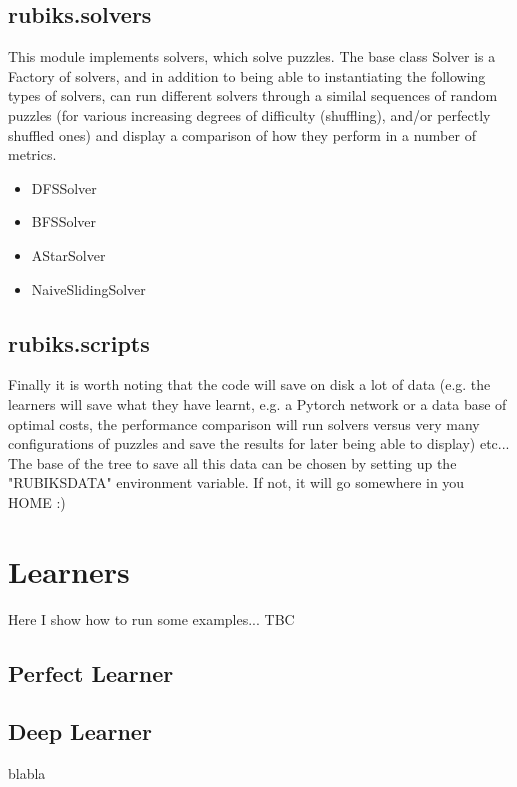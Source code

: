 \subsection{rubiks.solvers}
This module implements solvers, which solve puzzles. The base class Solver is a Factory of solvers, and in addition to being able to instantiating the following types of solvers, can run different solvers through a similal sequences of random puzzles (for various increasing degrees of difficulty (shuffling), and/or perfectly shuffled ones) and display a comparison of how they perform in a number of metrics.

\begin{itemize}
\item DFSSolver
\item BFSSolver
\item AStarSolver
\item NaiveSlidingSolver
\end{itemize}

\subsection{rubiks.scripts}


Finally it is worth noting that the code will save on disk a lot of data (e.g. the learners will save what they have learnt, e.g. a Pytorch network or a data base of optimal costs, the performance comparison will run solvers versus very many configurations of puzzles and save the results for later being able to display) etc... The base of the tree to save all this data can be chosen by setting up the "RUBIKSDATA" environment variable. If not, it will go somewhere in you HOME :)


\section{Learners}

Here I show how to run some examples... TBC

\subsection{Perfect Learner}
\label{PLSS}


\subsection{Deep Learner}
\label{DLSS}
blabla

